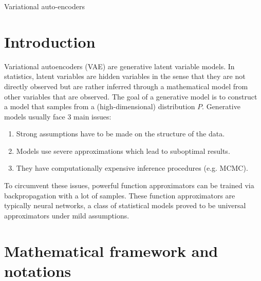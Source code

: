 \documentclass[12pt]{article}
\begin{document}
\begin{center}
    \LARGE
    Variational auto-encoders
\end{center}

\section{Introduction}

Variational autoencoders (VAE) are generative latent variable models.
In statistics, latent variables are hidden variables in the sense that they are not directly observed but are rather inferred through a mathematical model from other variables that are observed.
The goal of a generative model is to construct a model that samples from a (high-dimensional) distribution $P$.
Generative models usually face 3 main issues:
%
\begin{enumerate}
    \item Strong assumptions have to be made on the structure of the data.
    \item Models use severe approximations which lead to suboptimal results.
    \item They have computationally expensive inference procedures (e.g. MCMC).
\end{enumerate}
%
To circumvent these issues, powerful function approximators can be trained via backpropagation with a lot of samples.
These function approximators are typically neural networks, a class of statistical models proved to be universal approximators under mild assumptions.

\section{Mathematical framework and notations}
%
\end{document}
